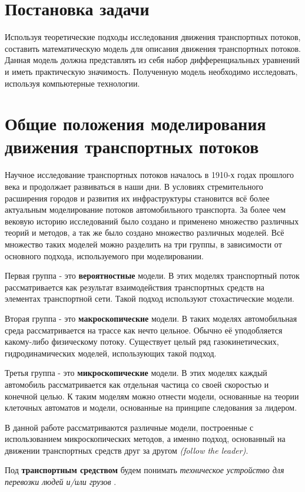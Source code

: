 \documentclass[12pt, a4paper]{extarticle}
\numberwithin{equation}{section}
\begin{document}
\newpage
\section{Постановка задачи} 
Используя теоретические подходы исследования движения транспортных потоков, составить математическую модель для описания движения транспортных потоков. Данная модель должна представлять из себя набор дифференциальных уравнений и иметь практическую значимость. Полученную модель необходимо исследовать, используя компьютерные технологии.   

\newpage
\section{Общие положения моделирования движения транспортных потоков}
Научное исследование транспортных потоков началось в 1910-х годах прошлого века и продолжает развиваться в наши дни. В условиях стремительного расширения городов и развития их инфраструктуры становится всё более актуальным моделирование потоков автомобильного транспорта. За более чем вековую историю исследований было создано и применено множество различных теорий и методов, а так же было создано множество различных моделей. Всё множество таких моделей можно разделить на три группы, в зависимости от основного подхода, используемого при моделировании.

Первая группа - это \textbf{вероятностные} модели. В этих моделях транспортный поток рассматривается как результат взаимодействия транспортных средств на элементах транспортной сети.
Такой подход используют стохастические модели.

Вторая группа - это \textbf{макроскопические} модели. В таких моделях автомобильная среда рассматривается на трассе как нечто цельное. Обычно её уподобляется какому-либо физическому потоку. Существует целый ряд газокинетических, гидродинамических моделей, использующих такой подход.

Третья группа - это \textbf{микроскопические} модели. В этих моделях каждый автомобиль рассматривается как отдельная частица со своей скоростью и конечной целью. К таким моделям можно отнести модели, основанные на теории клеточных автоматов и модели, основанные на принципе следования за лидером.

В данной работе рассматриваются различные модели, построенные с использованием микроскопических методов, а именно подход, основанный на движении транспортных средств друг за другом {\it(follow the leader)}.

Под \textbf{транспортным средством} будем понимать {\it техническое устройство для перевозки людей и/или грузов} \cite{TrafficFlow}.
\end{document}
